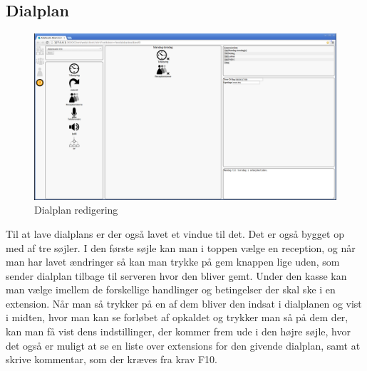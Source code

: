 \subsection{Dialplan}
\begin{figure}[ht!]
\centering
\includegraphics[width=\textwidth]{images/screen_dialplan.png}
\caption{Dialplan redigering}
\label{fig:screendialplan}
\end{figure}
Til at lave dialplans er der også lavet et vindue til det. Det er også bygget op med af tre søjler. I den første søjle kan man i toppen vælge en reception, og når man har lavet ændringer så kan man trykke på gem knappen lige uden, som sender dialplan tilbage til serveren hvor den bliver gemt. Under den kasse kan man vælge imellem de forskellige handlinger og betingelser der skal ske i en extension. Når man så trykker på en af dem bliver den indsat i dialplanen og vist i midten, hvor man kan se forløbet af opkaldet og trykker man så på dem der, kan man få vist dens indstillinger, der kommer frem ude i den højre søjle, hvor det også er muligt at se en liste over extensions for den givende dialplan, samt at skrive kommentar, som der kræves fra krav F10.


%    
%
%

